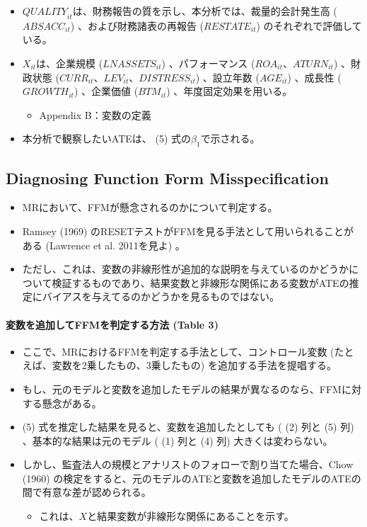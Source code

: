 \begin{itemize}
 \item $\mathit{QUALITY}_{it}$は、財務報告の質を示し、本分析では、裁量的会計発生高 ($\mathit{ABSACC}_{it}$) 、および財務諸表の再報告 ($\mathit{RESTATE}_{it}$) のそれぞれで評価している。
 \item $X_{it}$は、企業規模 ($\mathit{LNASSETS}_{it}$) 、パフォーマンス ($\mathit{ROA}_{it}$、$\mathit{ATURN}_{it}$) 、財政状態 ($\mathit{CURR}_{it}$、$\mathit{LEV}_{it}$、$\mathit{DISTRESS}_{it}$) 、設立年数 ($\mathit{AGE}_{it}$) 、成長性 ($\mathit{GROWTH}_{it}$) 、企業価値 ($\mathit{BTM}_{it}$) 、年度固定効果を用いる。
  \begin{itemize}
   \item Appendix B：変数の定義
  \end{itemize}
 \item 本分析で観察したいATEは、 (5) 式の$\beta_1$で示される。
\end{itemize}

\subsection*{Diagnosing Function Form Misspecification}
\begin{itemize}
 \item MRにおいて、FFMが懸念されるのかについて判定する。
 \item Ramsey (1969) のRESETテストがFFMを見る手法として用いられることがある (Lawrence et al. 2011を見よ) 。
 \item ただし、これは、変数の非線形性が追加的な説明を与えているのかどうかについて検証するものであり、結果変数と非線形な関係にある変数がATEの推定にバイアスを与えてるのかどうかを見るものではない。
\end{itemize}

\paragraph{変数を追加してFFMを判定する方法 (Table 3) }

\begin{itemize}
 \item ここで、MRにおけるFFMを判定する手法として、コントロール変数 (たとえば、変数を2乗したもの、3乗したもの) を追加する手法を提唱する。
 \item もし、元のモデルと変数を追加したモデルの結果が異なるのなら、FFMに対する懸念がある。
 \item  (5) 式を推定した結果を見ると、変数を追加したとしても ( (2) 列と (5) 列) 、基本的な結果は元のモデル ( (1) 列と (4) 列) 大きくは変わらない。
 \item しかし、監査法人の規模とアナリストのフォローで割り当てた場合、Chow (1960) の検定をすると、元のモデルのATEと変数を追加したモデルのATEの間で有意な差が認められる。
  \begin{itemize}
   \item これは、$X$と結果変数が非線形な関係にあることを示す。
  \end{itemize}
\end{itemize}

